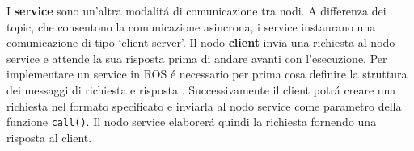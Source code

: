 I \textbf{service} sono un'altra modalit\'{a} di comunicazione tra nodi. A differenza dei topic, che consentono la comunicazione 
asincrona, i service instaurano una comunicazione di tipo `client-server'. Il nodo \textbf{client} invia una richiesta al nodo service e 
attende la sua risposta prima di andare avanti con l'esecuzione. 
Per implementare un service in ROS \'{e} necessario per prima cosa definire la struttura dei messaggi di richiesta e 
risposta \cite{service}. Successivamente il client potr\'{a} creare una richiesta nel formato specificato e inviarla al nodo service  
come parametro della funzione \verb|call()|. 
Il nodo service elaborer\'{a} quindi la richiesta fornendo una risposta al client.